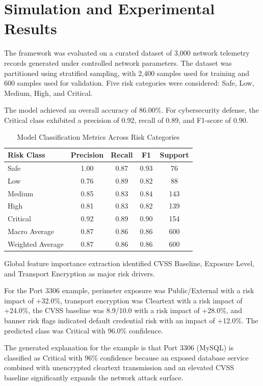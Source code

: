 \documentclass[conference]{IEEEtran}
\begin{document}
\section{Simulation and Experimental Results}
The framework was evaluated on a curated dataset of 3,000 network telemetry records generated under controlled network parameters. The dataset was partitioned using stratified sampling, with 2,400 samples used for training and 600 samples used for validation. Five risk categories were considered: Safe, Low, Medium, High, and Critical.

The model achieved an overall accuracy of 86.00\%. For cybersecurity defense, the Critical class exhibited a precision of 0.92, recall of 0.89, and F1-score of 0.90.

\begin{table}[htbp]
\caption{Model Classification Metrics Across Risk Categories}
\begin{center}
\begin{tabular}{lcccc}
\toprule
\textbf{Risk Class} & \textbf{Precision} & \textbf{Recall} & \textbf{F1} & \textbf{Support} \\
\midrule
Safe & 1.00 & 0.87 & 0.93 & 76 \\
Low & 0.76 & 0.89 & 0.82 & 88 \\
Medium & 0.85 & 0.83 & 0.84 & 143 \\
High & 0.81 & 0.83 & 0.82 & 139 \\
Critical & 0.92 & 0.89 & 0.90 & 154 \\
\midrule
Macro Average & 0.87 & 0.86 & 0.86 & 600 \\
Weighted Average & 0.87 & 0.86 & 0.86 & 600 \\
\bottomrule
\end{tabular}
\label{tab:metrics}
\end{center}
\end{table}

Global feature importance extraction identified CVSS Baseline, Exposure Level, and Transport Encryption as major risk drivers.

For the Port 3306 example, perimeter exposure was Public/External with a risk impact of +32.0\%, transport encryption was Cleartext with a risk impact of +24.0\%, the CVSS baseline was 8.9/10.0 with a risk impact of +28.0\%, and banner risk flags indicated default credential risk with an impact of +12.0\%. The predicted class was Critical with 96.0\% confidence.

The generated explanation for the example is that Port 3306 (MySQL) is classified as Critical with 96\% confidence because an exposed database service combined with unencrypted cleartext transmission and an elevated CVSS baseline significantly expands the network attack surface.
\end{document}
